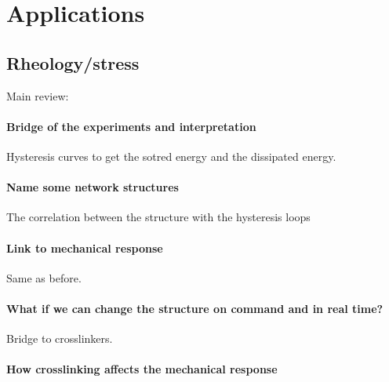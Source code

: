 \section{Applications}

\subsection{Rheology/stress}\label{ch1:NetworkStructure}

Main review:\citep{guPolymerNetworksPlastics2020,sheikoArchitecturalCodeRubber2019}

\paragraph{Bridge of the experiments and interpretation} Hysteresis curves to get the sotred energy and the dissipated energy.

\paragraph{Name some network structures} The correlation between the structure with the hysteresis loops

\paragraph{Link to mechanical response} Same as before.


\paragraph{What if we can change the structure on command and in real time?} Bridge to crosslinkers.

\paragraph{How crosslinking affects the mechanical response}

